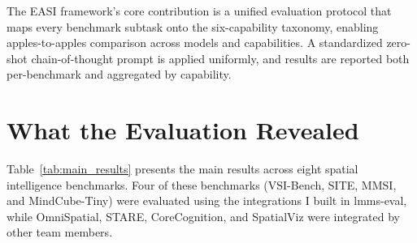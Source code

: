 The EASI framework's core contribution is a unified evaluation protocol that maps every benchmark subtask onto the six-capability taxonomy, enabling apples-to-apples comparison across models and capabilities. A standardized zero-shot chain-of-thought prompt is applied uniformly, and results are reported both per-benchmark and aggregated by capability.

\section{What the Evaluation Revealed}

Table~\ref{tab:main_results} presents the main results across eight spatial intelligence benchmarks. Four of these benchmarks (VSI-Bench, SITE, MMSI, and MindCube-Tiny) were evaluated using the integrations I built in lmms-eval, while OmniSpatial, STARE, CoreCognition, and SpatialViz were integrated by other team members.

